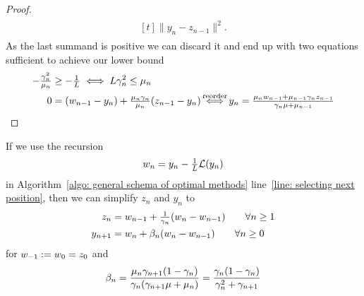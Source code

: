 \begin{proof}
\begin{align*}
\begin{aligned}[t]
{			}
			\|y_n - z_{n-1}\|^2.
		\end{aligned}
	\end{align*}
	As the last summand is positive we can discard it and end up with two equations
	sufficient to achieve our lower bound
	\begin{align*}
		-\tfrac{\gamma_n^2}{\lbound_n}
		&\ge -\tfrac{1}{\ubound} \iff \ubound\gamma_n^2 \le \lbound_n
		\\
		0
		&= (\weights_{n-1} -y_n) + \tfrac{\lbound_n\gamma_n}{\lbound_n}(z_{n-1} - y_n)
		\xiff{\text{reorder}}
		y_n
		= \tfrac{\lbound_n\weights_{n-1} + \lbound_{n-1}\gamma_n z_{n-1}}{\gamma_n\lbound + \lbound_{n-1}}
		\qedhere
	\end{align*}
\end{proof}

\begin{lemma}\label{lem-appendix: streamline general schema of optimal methods}
	If we use the recursion
	\begin{align}
		w_n = y_n - \tfrac1{L}\mathcal{L}(y_n)
	\end{align}
	in Algorithm~\ref{algo: general schema of optimal methods} line~\ref{line:
	selecting next position}, then we can simplify \(z_n\) and \(y_n\)
	to
	\begin{align}
		\label{eq: z_n recursion}
		z_n
		&= w_{n-1} + \tfrac1{\gamma_n}(w_n-w_{n-1})
		\qquad \forall n\ge 1\\
		y_{n+1}
		&=w_n + \beta_n(w_n-w_{n-1}) \qquad \forall n\ge 0
	\end{align}
	for \(w_{-1}:=w_0=z_0\) and
	\begin{align}
		\beta_n
		= \frac{\mu_n \gamma_{n+1}(1-\gamma_n)}{\gamma_n(\gamma_{n+1}\mu +\mu_n)}
		= \frac{\gamma_n(1-\gamma_n)}{\gamma_n^2 + \gamma_{n+1}}
	\end{align}
\end{lemma}
